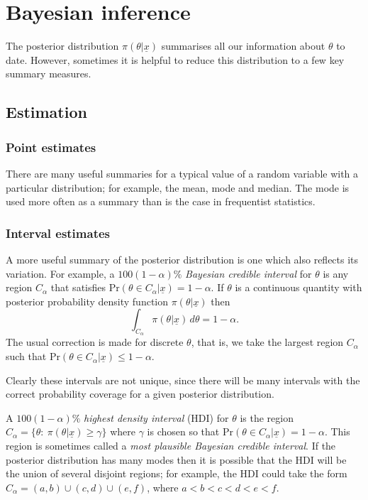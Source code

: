 \chapter{Bayesian inference}
The posterior distribution $\pi(\theta|\underline{x})$ summarises all our
information about $\theta$ to date. However, sometimes it is
helpful to reduce this distribution to a few key summary measures.

\section{Estimation}
\subsection*{Point estimates}
There are many useful summaries for a typical value of a random
variable with a particular distribution; for example, the mean, mode
and median. The mode is used more often as a summary than is the case
in frequentist statistics.

\subsection*{Interval estimates}
A more useful summary of the posterior distribution is one which also
reflects its variation.  For example, a $100(1-\alpha)\%$ {\it Bayesian
credible interval} for $\theta$ is any region $C_\alpha$ that
satisfies $\text{Pr}(\theta\in C_\alpha|\underline{x})=1-\alpha$. If $\theta$
is a continuous quantity with posterior probability density function
$\pi(\theta|\underline{x})$ then
\begin{equation*}
\int_{C_\alpha} \pi(\theta|\underline{x})\,d\theta = 1-\alpha.
\end{equation*}
The usual correction is made for discrete $\theta$, that is, we
take the largest region $C_\alpha$ such that $\text{Pr}(\theta\in
C_\alpha|\underline{x})\leq 1-\alpha$. 

Clearly these intervals are not unique, since there will be many
intervals with the correct probability coverage for a given posterior
distribution.

A $100(1-\alpha)\%$ \emph{highest density interval} (HDI)  for
$\theta$ is the region
$C_\alpha=\{\theta:~\pi(\theta|\underline{x})\geq\gamma\}$ where
$\gamma$ is chosen so that $\text{Pr}(\theta\in C_\alpha|\underline{x})=1-\alpha$.
This region is sometimes called a {\it most plausible Bayesian credible interval}. If the posterior distribution has many modes
then it is possible that the HDI will be the union of several
disjoint regions; for example, the HDI could take the form
$C_\alpha=(a,b)\cup(c,d)\cup(e,f)$, where $a<b<c<d<e<f$.

